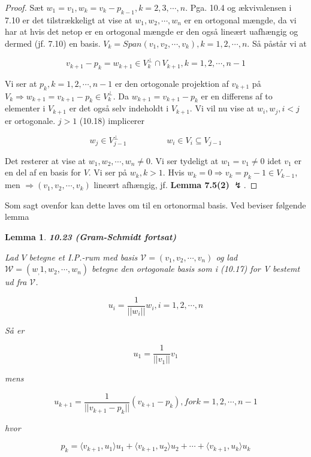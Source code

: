 \documentclass[paper=a4, fontsize=11pt]{scrartcl} %
\newtheorem*{lemma}{Lemma}
\newenvironment{cstmlemma}[1]{\begin{lemma} {\normalfont\textbf{#1}}}{\end{lemma}}
\begin{document}
			\begin{proof}
				
				Sæt $w_1 = v_1, w_k = v_k - p_{k-1}, k = 2,3,\cdots,n$. Pga. 10.4 og ækvivalensen i 7.10 er det tilstrækkeligt at vise at $w_1,w_2,\cdots,w_n$ er en ortogonal mængde, da vi har at hvis det netop er en ortogonal mængde er den også lineært uafhængig og dermed (jf. 7.10) en basis.
				$V_k = Span(v_1,v_2,\cdots,v_k), k = 1,2,\cdots,n$. Så påstår vi at
				
				\[v_{k+1}-p_k=w_{k+1} \in V_k^{\bot} \cap V_{k+1}, k = 1,2,\cdots,n-1 \tag{10.18}\]
				
				Vi ser at $p_k, k = 1,2,\cdots,n-1$ er den ortogonale projektion af $v_{k+1}$ på $V_k \Rightarrow w_{k+1} = v_{k+1} - p_k \in V_k^{\bot}$. Da $w_{k+1} = v_{k+1} - p_k$ er en differens af to elementer i $V_{k+1}$ er det også selv indeholdt i $V_{k+1}$. Vi vil nu vise at $w_i, w_j, i < j$ er ortogonale. $j > 1$ (10.18) implicerer
				
				\[w_j\in V^\bot_{j-1} \hspace{2cm} w_i\in V_i\subseteq V_{j-1}\]
				
				Det resterer at vise at $w_1,w_2,\cdots,w_n \not = 0$. Vi ser tydeligt at $w_1 = v_1 \not = 0$ idet $v_1$ er en del af en basis for $V$. Vi ser på $w_k, k > 1$. Hvis $w_k = 0 \Rightarrow v_{k} = p_k-1 \in V_{k-1}$, men $\Rightarrow (v_1,v_2,\cdots,v_k)$ lineært afhængig, jf. \textbf{Lemma 7.5(2)} $\lightning$.
				
			\end{proof}
			
			Som sagt ovenfor kan dette laves om til en ortonormal basis. Ved beviser følgende lemma
			
			\begin{cstmlemma}{10.23 (Gram-Schmidt fortsat)}
				
				
				Lad $V$ betegne et I.P.-rum med basis $\mathcal{V} = (v_1,v_2,\cdots,v_n)$ og lad $\mathcal{W} = (w_,1,w_2,\cdots,w_n)$ betegne den ortogonale basis som i (10.17) for V bestemt ud fra $\mathcal{V}$.
				
				\[u_i = \frac{1}{||w_i||}w_i, i = 1,2,\cdots,n\]
				
				Så er 
				
				\[u_1 = \frac{1}{||v_1||}v_1\]
				
				mens
				
				\[u_{k+1} = \frac{1}{||v_{k+1}-p_k||}(v_{k+1}-p_k), for k = 1,2,\cdots,n-1\]
				
				hvor
				
				\[p_k = \langle v_{k+1} , u_1 \rangle u_1 + \langle v_{k+1},u_2 \rangle u_2 + \cdots + \langle v_{k+1},u_k \rangle u_k \tag{10.22}\]
				
			\end{cstmlemma}
			
\end{document}
